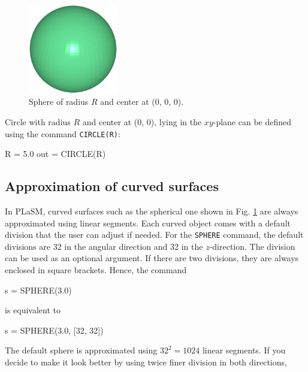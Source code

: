 \begin{figure}[!ht]
\begin{center}
\includegraphics[width=0.35\textwidth]{img/sphere-1.png}
\end{center}
\vspace{-4mm}
\caption{Sphere of radius $R$ and center at (0, 0, 0).}
\label{fig:sphere-1}
\vspace{-1cm}
\end{figure}
\newpage
\noindent
Circle with radius $R$ and center at (0, 0), lying in the $xy$-plane 
can be defined using the command {\tt CIRCLE(R)}:

\begin{bluecode}
R = 5.0
out = CIRCLE(R)
\end{bluecode}

\subsection{Approximation of curved surfaces} 

In PLaSM, curved surfaces such as the spherical one shown in Fig. \ref{fig:sphere-1}
are always approximated using linear segments. Each curved object comes
with a default division that the user can adjust if needed. For the 
{\tt SPHERE} command, the default divisions are 32 in the angular direction 
and 32 in the $z$-direction. The division can be used as an optional argument.
If there are two divisions, they are always enclosed in square brackets. Hence, 
the command

\begin{bluecode}
s = SPHERE(3.0)
\end{bluecode}
is equivalent to 

\begin{bluecode}
s = SPHERE(3.0, [32, 32])
\end{bluecode}
The default sphere is approximated using $32^2 = 1024$ linear
segments. If you decide to make it look better by using 
twice finer division in both directions,

